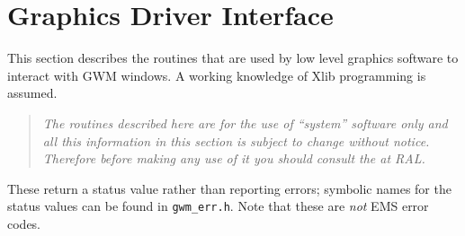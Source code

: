 \section{Graphics Driver Interface}

This section describes the routines that are used by low level graphics 
software to interact with GWM windows. A working knowledge of Xlib
programming is assumed.
\begin{quote}{\em
The routines described here are for the use of ``system'' software only
and all this information in this section is subject to change without
notice. Therefore before making any use of it you should consult the 
at RAL.}
\end{quote}
These return a status value rather than reporting errors; symbolic names
for the status values can be found in {\tt gwm\_err.h}. Note that these are
{\em not} EMS error codes.

